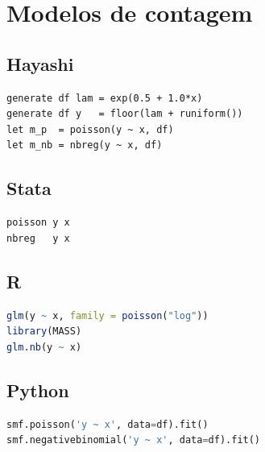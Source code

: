 \section{Modelos de contagem}

\subsection*{Hayashi}

\begin{lstlisting}
generate df lam = exp(0.5 + 1.0*x)
generate df y   = floor(lam + runiform())
let m_p  = poisson(y ~ x, df)
let m_nb = nbreg(y ~ x, df)
\end{lstlisting}

\subsection*{Stata}

\begin{lstlisting}[language={}, basicstyle=\ttfamily\small,
  frame=single, numbers=none, backgroundcolor=\color{codbg}]
poisson y x
nbreg   y x
\end{lstlisting}

\subsection*{R}

\begin{lstlisting}[language=R, basicstyle=\ttfamily\small,
  frame=single, numbers=none, backgroundcolor=\color{codbg},
  keywordstyle=\color{keyword}\bfseries,
  stringstyle=\color{string},
  commentstyle=\color{comment}\itshape]
glm(y ~ x, family = poisson("log"))
library(MASS)
glm.nb(y ~ x)
\end{lstlisting}

\subsection*{Python}

\begin{lstlisting}[language=Python, basicstyle=\ttfamily\small,
  frame=single, numbers=none, backgroundcolor=\color{codbg},
  keywordstyle=\color{keyword}\bfseries,
  stringstyle=\color{string},
  commentstyle=\color{comment}\itshape]
smf.poisson('y ~ x', data=df).fit()
smf.negativebinomial('y ~ x', data=df).fit()
\end{lstlisting}

